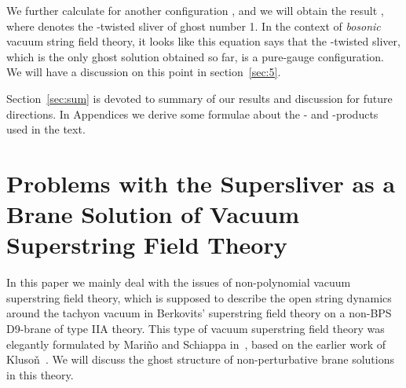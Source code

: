 \documentclass[a4paper,12pt]{article}
\providecommand{\cQ}{\mathcal{Q}}
\providecommand{\tp}{\prime\prime\prime}
\providecommand{\sectiono}[1]{\section{#1}\setcounter{equation}{0}}
\begin{document}
We further calculate \coordHE{} for another configuration \coordHE{}, 
and we will obtain the result \myHighlight{$\Xi^{\prime}\propto
e^{-\Phi_e}\cQ e^{\Phi_e}$}\coordHE{}, where \myHighlight{$\Xi^{\prime}$}\coordHE{} denotes the \coordHE{}-twisted sliver of ghost number 1. 
In the context of \textit{bosonic} vacuum string field theory, it looks like this equation says that 
the \coordHE{}-twisted sliver, which is the only ghost solution obtained so far, is a pure-gauge 
configuration. We will have a discussion on this point in section~\ref{sec:5}. 

Section~\ref{sec:sum} is devoted to summary of our results and discussion for future directions. 
In Appendices we derive some formulae about the \myHighlight{$*$}\coordHE{}- and \myHighlight{$*^{\tp}$}\coordHE{}-products used in the text. 


\sectiono{Problems with the Supersliver as a Brane Solution of Vacuum Superstring Field 
Theory}\label{sec:2}
In this paper we mainly deal with the issues of non-polynomial vacuum superstring field theory, 
which is supposed to describe the open string dynamics around the tachyon vacuum in 
Berkovits' superstring field theory on a non-BPS D9-brane of type IIA theory. 
This type of vacuum superstring field theory was elegantly formulated by Mari{\~n}o and 
Schiappa in~\cite{MS}, based on the earlier work of Kluso\v{n}~\cite{Klu5}. 
We will discuss the ghost structure of non-perturbative brane solutions in this theory. 
\medskip
\end{document}
